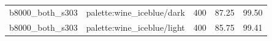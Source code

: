 \begin{longtable}{l>{\raggedright\arraybackslash}p{.42\linewidth}rrr}
b8000\_\allowbreak{}both\_\allowbreak{}s303 & %
palette:wine\_\allowbreak{}iceblue/dark & %
400 & %
87.25 & %
99.50 \\ %

b8000\_\allowbreak{}both\_\allowbreak{}s303 & %
palette:wine\_\allowbreak{}iceblue/light & %
400 & %
85.75 & %
99.41 \\ %

\end{longtable}
\endgroup
